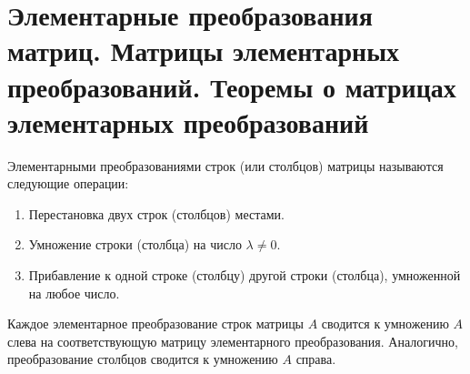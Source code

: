 \section{Элементарные преобразования матриц. Матрицы элементарных преобразований. Теоремы о матрицах элементарных преобразований}

\begin{definition}
Элементарными преобразованиями строк (или столбцов) матрицы называются следующие операции:
\begin{enumerate}
    \item Перестановка двух строк (столбцов) местами.
    \item Умножение строки (столбца) на число $\lambda \neq 0$.
    \item Прибавление к одной строке (столбцу) другой строки (столбца), умноженной на любое число.
\end{enumerate}
\end{definition}

\begin{theorem}
Каждое элементарное преобразование строк матрицы $A$ сводится к умножению $A$ слева на соответствующую матрицу элементарного преобразования. Аналогично, преобразование столбцов сводится к умножению $A$ справа.
\end{theorem}


